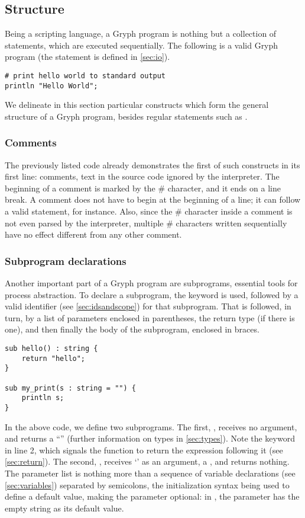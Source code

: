 \subsection{Structure}
Being a scripting language, a Gryph program is nothing but a collection of statements, which are executed sequentially. The following is a valid Gryph program (the  statement is defined in \ref{sec:io}).

\begin{lstlisting}[language=Gryph]
# print hello world to standard output
println "Hello World";
\end{lstlisting}

We delineate in this section particular constructs which form the general structure of a Gryph program, besides regular statements such as .

\subsubsection{Comments}
The previously listed code already demonstrates the first of such constructs in its first line: comments, text in the source code ignored by the interpreter. The beginning of a comment is marked by the \# character, and it ends on a line break. A comment does not have to begin at the beginning of a line; it can follow a valid statement, for instance. Also, since the \# character inside a comment is not even parsed by the interpreter, multiple \# characters written sequentially have no effect different from any other comment.

\subsubsection{Subprogram declarations}
\label{sec:subprogram}
Another important part of a Gryph program are subprograms, essential tools for process abstraction. To declare a subprogram, the  keyword is used, followed by a valid identifier (see \ref{sec:idsandscope}) for that subprogram. That is followed, in turn, by a list of parameters enclosed in parentheses, the return type (if there is one), and then finally the body of the subprogram, enclosed in braces.
\begin{lstlisting}[language=Gryph]
sub hello() : string {
	return "hello";
}

sub my_print(s : string = "") {
	println s;
}
\end{lstlisting}
In the above code, we define two subprograms. The first, , receives no argument, and returns a ``'' (further information on types in \ref{sec:types}). Note the  keyword in line 2, which signals the function to return the expression following it (see \ref{sec:return}). The second, , receives `' as an argument, a , and returns nothing. 
The parameter list is nothing more than a sequence of variable declarations (see \ref{sec:variables}) separated by semicolons, the initialization syntax being used to define a default value, making the parameter optional: in , the parameter  has the empty string as its default value.

